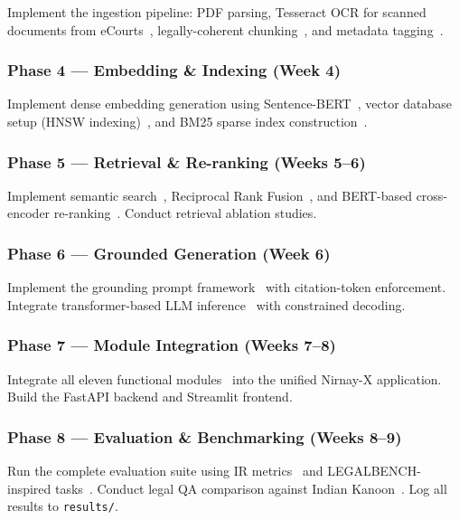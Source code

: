 \documentclass[12pt,a4paper]{article}
\begin{document}
Implement the ingestion pipeline: PDF parsing, Tesseract OCR for scanned documents
from eCourts~\cite{ecourts}, legally-coherent chunking~\cite{manning2008ir}, and
metadata tagging~\cite{mlaw}.

\subsubsection{Phase 4 --- Embedding \& Indexing (Week 4)}

Implement dense embedding generation using Sentence-BERT~\cite{reimers2019sbert},
vector database setup (HNSW indexing)~\cite{manning2008ir}, and BM25 sparse index
construction~\cite{manning2008ir}.

\subsubsection{Phase 5 --- Retrieval \& Re-ranking (Weeks 5--6)}

Implement semantic search~\cite{reimers2019sbert}, Reciprocal Rank Fusion~\cite{manning2008ir},
and BERT-based cross-encoder re-ranking~\cite{devlin2019bert}. Conduct retrieval
ablation studies.

\subsubsection{Phase 6 --- Grounded Generation (Week 6)}

Implement the grounding prompt framework~\cite{lewis2020rag} with citation-token
enforcement. Integrate transformer-based LLM inference~\cite{vaswani2017attention}
with constrained decoding.

\subsubsection{Phase 7 --- Module Integration (Weeks 7--8)}

Integrate all eleven functional modules~\cite{ashley2017ai} into the unified Nirnay-X
application. Build the FastAPI backend and Streamlit frontend.

\subsubsection{Phase 8 --- Evaluation \& Benchmarking (Weeks 8--9)}

Run the complete evaluation suite using IR metrics~\cite{manning2008ir} and
LEGALBENCH-inspired tasks~\cite{guha2023legalbench}. Conduct legal QA comparison
against Indian Kanoon~\cite{indiankanoon}. Log all results to \texttt{results/}.
\end{document}
